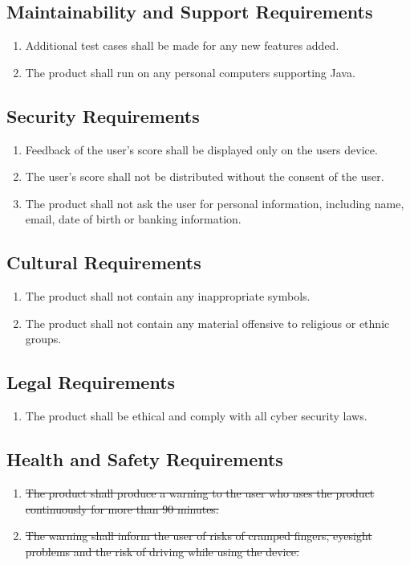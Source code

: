 \documentclass[12pt, titlepage]{article}
\begin{document}
\subsection{Maintainability and Support Requirements}
\begin{enumerate}
\item Additional test cases shall be made for any new features added.
\item The product shall run on any personal computers supporting Java.
\end{enumerate}

\subsection{Security Requirements}
\begin{enumerate}
\item Feedback of the user's score shall be displayed only on the users device. 
\item The user's score shall not be distributed without the consent of the user.
\item The product shall not ask the user for personal information, including name, email, date of birth or banking information.
\end{enumerate}

\subsection{Cultural Requirements}
\begin{enumerate}
\item The product shall not contain any inappropriate symbols. 
\item The product shall not contain any material offensive to religious or ethnic groups.
\end{enumerate}

\subsection{Legal Requirements}
\begin{enumerate}
\item The product shall be ethical and comply with all cyber security laws.
\end{enumerate}

\subsection{Health and Safety Requirements}
\begin{enumerate}
\item \sout{The product shall produce a warning to the user who uses the product continuously for more than 90 minutes. }
\item \sout{The warning shall inform the user of risks  of cramped fingers, eyesight problems and the risk of driving while using the device.}
\end{enumerate}
\end{document}
